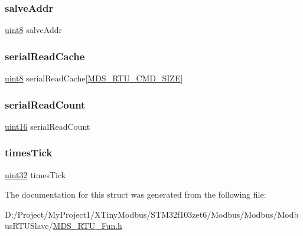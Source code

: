 \subsubsection{\texorpdfstring{salve\+Addr}{salveAddr}}
{\footnotesize\ttfamily \mbox{\hyperlink{_m_d___r_t_u___type_8h_adde6aaee8457bee49c2a92621fe22b79}{uint8}} salve\+Addr}

\mbox{\label{struct_p_modbus_s___r_t_u_a5e87b8f71c7e3e5622f156495ff5a982}} 
\subsubsection{\texorpdfstring{serial\+Read\+Cache}{serialReadCache}}
{\footnotesize\ttfamily \mbox{\hyperlink{_m_d___r_t_u___type_8h_adde6aaee8457bee49c2a92621fe22b79}{uint8}} serial\+Read\+Cache\mbox{[}\mbox{\hyperlink{_m_d___r_t_u___config_8h_a97b37dd5cedad8ef355410106c692d8c}{M\+D\+S\+\_\+\+R\+T\+U\+\_\+\+C\+M\+D\+\_\+\+S\+I\+ZE}}\mbox{]}}

\mbox{\label{struct_p_modbus_s___r_t_u_a255aad6bfe97d5e239d9beaad7e348e4}} 
\subsubsection{\texorpdfstring{serial\+Read\+Count}{serialReadCount}}
{\footnotesize\ttfamily \mbox{\hyperlink{_m_d___r_t_u___type_8h_a05f6b0ae8f6a6e135b0e290c25fe0e4e}{uint16}} serial\+Read\+Count}

\mbox{\label{struct_p_modbus_s___r_t_u_a0148764b78c9ff76c2105964bf00daa7}} 
\subsubsection{\texorpdfstring{times\+Tick}{timesTick}}
{\footnotesize\ttfamily \mbox{\hyperlink{_m_d___r_t_u___type_8h_a1134b580f8da4de94ca6b1de4d37975e}{uint32}} times\+Tick}



The documentation for this struct was generated from the following file\+:\begin{DoxyCompactItemize}
\item 
D\+:/\+Project/\+My\+Project1/\+X\+Tiny\+Modbus/\+S\+T\+M32f103zet6/\+Modbus/\+Modbus/\+Modbus\+R\+T\+U\+Slave/\mbox{\hyperlink{_m_d_s___r_t_u___fun_8h}{M\+D\+S\+\_\+\+R\+T\+U\+\_\+\+Fun.\+h}}\end{DoxyCompactItemize}
